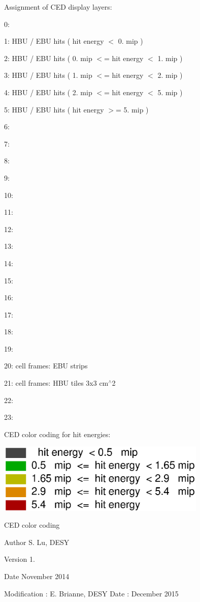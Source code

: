 Assignment of C\-E\-D display layers\-:


\begin{DoxyItemize}
\item 0\-:
\item 1\-: H\-B\-U / E\-B\-U hits ( hit energy $<$ 0. mip )
\item 2\-: H\-B\-U / E\-B\-U hits ( 0. mip $<$= hit energy $<$ 1. mip )
\item 3\-: H\-B\-U / E\-B\-U hits ( 1. mip $<$= hit energy $<$ 2. mip )
\item 4\-: H\-B\-U / E\-B\-U hits ( 2. mip $<$= hit energy $<$ 5. mip )
\item 5\-: H\-B\-U / E\-B\-U hits ( hit energy $>$= 5. mip )
\item 6\-:
\item 7\-:
\item 8\-:
\item 9\-:
\item 10\-:
\item 11\-:
\item 12\-:
\item 13\-:
\item 14\-:
\item 15\-:
\item 16\-:
\item 17\-:
\item 18\-:
\item 19\-:
\item 20\-: cell frames\-: E\-B\-U strips
\item 21\-: cell frames\-: H\-B\-U tiles 3x3 cm$^\wedge$2
\item 22\-:
\item 23\-:
\end{DoxyItemize}

C\-E\-D color coding for hit energies\-:

 
\begin{DoxyImage}
\includegraphics[width=10cm]{EventDisplayProcessor_colorCode}
\caption{C\-E\-D color coding}
\end{DoxyImage}


\begin{DoxyAuthor}{Author}
S. Lu, D\-E\-S\-Y 
\end{DoxyAuthor}
\begin{DoxyVersion}{Version}
1. 
\end{DoxyVersion}
\begin{DoxyDate}{Date}
November 2014
\end{DoxyDate}
Modification \-: E. Brianne, D\-E\-S\-Y Date \-: December 2015 

